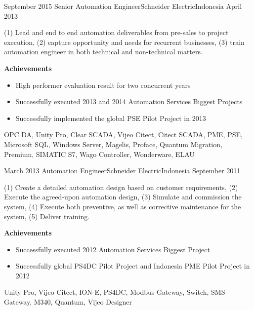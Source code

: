 \begin{experiences}
          \experience
    {September 2015}     {Senior Automation Engineer}{Schneider Electric}{Indonesia}
    {April 2013} { (1) Lead and end to end automation deliverables from pre-sales to project execution, (2) capture opportunity and needs for recurrent businesses, (3) train automation engineer in both technical and non-technical matters.
    
\textbf{Achievements} 
                      \begin{itemize}
                        \item High performer evaluation result for two concurrent years
                        \item Successfully executed 2013 and 2014 Automation Services Biggest Projects
                        \item Successfully implemented the global PSE Pilot Project in 2013
                      \end{itemize}
                    }
                    {OPC DA, Unity Pro, Clear SCADA, Vijeo Citect, Citect SCADA, PME, PSE, Microsoft SQL, Windows Server, Magelis, Proface, Quantum Migration, Premium, SIMATIC S7, Wago Controller, Wonderware, ELAU}
  
            \experience
    {March 2013}     {Automation Engineer}{Schneider Electric}{Indonesia}
    {September 2011} { (1) Create a detailed automation design based on customer requirements, (2) Execute the agreed-upon automation design, (3) Simulate and commission the system, (4) Execute both preventive, as well as corrective maintenance for the system, (5) Deliver training.
    
\textbf{Achievements} 
                      \begin{itemize}
                        \item Successfully executed 2012 Automation Services Biggest Project
                        \item Successfully global PS4DC Pilot Project and Indonesia PME Pilot Project in 2012
                      \end{itemize}
                    }
                    {Unity Pro, Vijeo Citect, ION-E, PS4DC, Modbus Gateway, Switch, SMS Gateway, M340, Quantum, Vijeo Designer}
  

\end{experiences}
